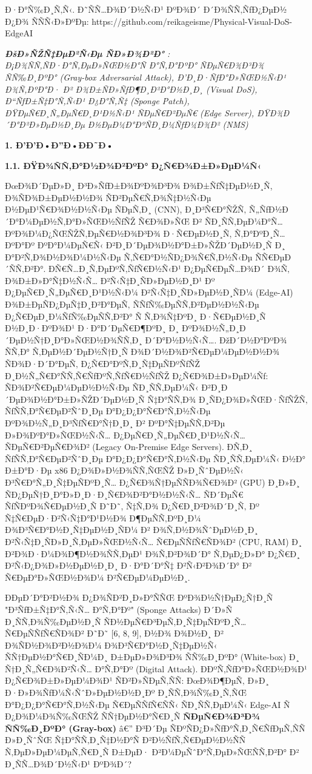 \documentclass[]{article}
\begin{document}
Ð·Ð°Ñ‰Ð¸Ñ‚Ñ‹. Ð˜ÑÑ…Ð¾Ð´Ð½Ñ‹Ð¹ ÐºÐ¾Ð´ Ð´Ð¾ÑÑ‚ÑƒÐ¿ÐµÐ½ Ð¿Ð¾ ÑÑÑ‹Ð»ÐºÐµ:
https://github.com/reikageisme/Physical-Visual-DoS-EdgeAI

\emph{\textbf{ÐšÐ»ÑŽÑ‡ÐµÐ²Ñ‹Ðµ ÑÐ»Ð¾Ð²Ð°} :} \emph{Ð¡Ð¾ÑÑ‚ÑÐ·Ð°Ñ‚ÐµÐ»ÑŒÐ½Ð°Ñ Ð°Ñ‚Ð°ÐºÐ° ÑÐµÑ€Ð¾Ð³Ð¾ ÑÑ‰Ð¸ÐºÐ° (Gray-box Adversarial Attack), Ð’Ð¸Ð·ÑƒÐ°Ð»ÑŒÐ½Ñ‹Ð¹ Ð¾Ñ‚ÐºÐ°Ð· Ð² Ð¾Ð±ÑÐ»ÑƒÐ¶Ð¸Ð²Ð°Ð½Ð¸Ð¸ (Visual DoS), Ð“ÑƒÐ±Ñ‡Ð°Ñ‚Ñ‹Ð¹ Ð¿Ð°Ñ‚Ñ‡ (Sponge Patch), ÐŸÐµÑ€Ð¸Ñ„ÐµÑ€Ð¸Ð¹Ð½Ñ‹Ð¹ ÑÐµÑ€Ð²ÐµÑ€ (Edge Server), ÐŸÐ¾Ð´Ð°Ð²Ð»ÐµÐ½Ð¸Ðµ Ð½ÐµÐ¼Ð°ÐºÑÐ¸Ð¼ÑƒÐ¼Ð¾Ð² (NMS)}

\textbf{1. Ð’Ð’Ð•Ð”Ð•ÐÐ˜Ð•}

\textbf{1.1. ÐŸÐ¾ÑÑ‚Ð°Ð½Ð¾Ð²ÐºÐ° Ð¿Ñ€Ð¾Ð±Ð»ÐµÐ¼Ñ‹}

ÐœÐ¾Ð´ÐµÐ»Ð¸ Ð³Ð»ÑƒÐ±Ð¾ÐºÐ¾Ð³Ð¾ Ð¾Ð±ÑƒÑ‡ÐµÐ½Ð¸Ñ, Ð¾ÑÐ¾Ð±ÐµÐ½Ð½Ð¾ ÑÐ²ÐµÑ€Ñ‚Ð¾Ñ‡Ð½Ñ‹Ðµ Ð½ÐµÐ¹Ñ€Ð¾Ð½Ð½Ñ‹Ðµ ÑÐµÑ‚Ð¸ (CNN), Ð¸Ð³Ñ€Ð°ÑŽÑ‚ Ñ„ÑƒÐ½Ð´Ð°Ð¼ÐµÐ½Ñ‚Ð°Ð»ÑŒÐ½ÑƒÑŽ Ñ€Ð¾Ð»ÑŒ Ð² ÑÐ¸ÑÑ‚ÐµÐ¼Ð°Ñ… ÐºÐ¾Ð¼Ð¿ÑŒÑŽÑ‚ÐµÑ€Ð½Ð¾Ð³Ð¾ Ð·Ñ€ÐµÐ½Ð¸Ñ, Ñ‚Ð°ÐºÐ¸Ñ… ÐºÐ°Ðº ÐºÐ°Ð¼ÐµÑ€Ñ‹ Ð²Ð¸Ð´ÐµÐ¾Ð½Ð°Ð±Ð»ÑŽÐ´ÐµÐ½Ð¸Ñ Ð¸ Ð°Ð²Ñ‚Ð¾Ð½Ð¾Ð¼Ð½Ñ‹Ðµ Ñ‚Ñ€Ð°Ð½ÑÐ¿Ð¾Ñ€Ñ‚Ð½Ñ‹Ðµ ÑÑ€ÐµÐ´ÑÑ‚Ð²Ð°. ÐÑ€Ñ…Ð¸Ñ‚ÐµÐºÑ‚ÑƒÑ€Ð½Ñ‹Ð¹ Ð¿ÐµÑ€ÐµÑ…Ð¾Ð´ Ð¾Ñ‚ Ð¾Ð±Ð»Ð°Ñ‡Ð½Ñ‹Ñ… Ð²Ñ‹Ñ‡Ð¸ÑÐ»ÐµÐ½Ð¸Ð¹ Ðº Ð¿ÐµÑ€Ð¸Ñ„ÐµÑ€Ð¸Ð¹Ð½Ñ‹Ð¼ Ð²Ñ‹Ñ‡Ð¸ÑÐ»ÐµÐ½Ð¸ÑÐ¼ (Edge-AI) Ð¾Ð±ÐµÑÐ¿ÐµÑ‡Ð¸Ð²Ð°ÐµÑ‚ ÑÑƒÑ‰ÐµÑÑ‚Ð²ÐµÐ½Ð½Ñ‹Ðµ Ð¿Ñ€ÐµÐ¸Ð¼ÑƒÑ‰ÐµÑÑ‚Ð²Ð° Ñ Ñ‚Ð¾Ñ‡ÐºÐ¸ Ð·Ñ€ÐµÐ½Ð¸Ñ Ð½Ð¸Ð·ÐºÐ¾Ð¹ Ð·Ð°Ð´ÐµÑ€Ð¶ÐºÐ¸ Ð¸ ÐºÐ¾Ð½Ñ„Ð¸Ð´ÐµÐ½Ñ†Ð¸Ð°Ð»ÑŒÐ½Ð¾ÑÑ‚Ð¸ Ð´Ð°Ð½Ð½Ñ‹Ñ…. ÐžÐ´Ð½Ð°ÐºÐ¾ ÑÑ‚Ð° Ñ‚ÐµÐ½Ð´ÐµÐ½Ñ†Ð¸Ñ Ð¾Ð´Ð½Ð¾Ð²Ñ€ÐµÐ¼ÐµÐ½Ð½Ð¾ ÑÐ¾Ð·Ð´Ð°ÐµÑ‚ Ð¿Ñ€Ð°ÐºÑ‚Ð¸Ñ‡ÐµÑÐºÑƒÑŽ Ð¸Ð½Ñ„Ñ€Ð°ÑÑ‚Ñ€ÑƒÐºÑ‚ÑƒÑ€Ð½ÑƒÑŽ Ð¿Ñ€Ð¾Ð±Ð»ÐµÐ¼Ñƒ: ÑÐ¾Ð²Ñ€ÐµÐ¼ÐµÐ½Ð½Ñ‹Ðµ ÑÐ¸ÑÑ‚ÐµÐ¼Ñ‹ Ð²Ð¸Ð´ÐµÐ¾Ð½Ð°Ð±Ð»ÑŽÐ´ÐµÐ½Ð¸Ñ Ñ‡Ð°ÑÑ‚Ð¾ Ð¸ÑÐ¿Ð¾Ð»ÑŒÐ·ÑƒÑŽÑ‚ ÑƒÑÑ‚Ð°Ñ€ÐµÐ²ÑˆÐ¸Ðµ Ð°Ð¿Ð¿Ð°Ñ€Ð°Ñ‚Ð½Ñ‹Ðµ ÐºÐ¾Ð½Ñ„Ð¸Ð³ÑƒÑ€Ð°Ñ†Ð¸Ð¸ Ð² ÐºÐ°Ñ‡ÐµÑÑ‚Ð²Ðµ Ð»Ð¾ÐºÐ°Ð»ÑŒÐ½Ñ‹Ñ… Ð¿ÐµÑ€Ð¸Ñ„ÐµÑ€Ð¸Ð¹Ð½Ñ‹Ñ… ÑÐµÑ€Ð²ÐµÑ€Ð¾Ð² (Legacy On-Premise Edge Servers). Ð­Ñ‚Ð¸ ÑƒÑÑ‚Ð°Ñ€ÐµÐ²ÑˆÐ¸Ðµ Ð°Ð¿Ð¿Ð°Ñ€Ð°Ñ‚Ð½Ñ‹Ðµ ÑÐ¸ÑÑ‚ÐµÐ¼Ñ‹ Ð½Ð° Ð±Ð°Ð·Ðµ x86 Ð¿Ð¾Ð»Ð½Ð¾ÑÑ‚ÑŒÑŽ Ð»Ð¸ÑˆÐµÐ½Ñ‹ Ð³Ñ€Ð°Ñ„Ð¸Ñ‡ÐµÑÐºÐ¸Ñ… Ð¿Ñ€Ð¾Ñ†ÐµÑÑÐ¾Ñ€Ð¾Ð² (GPU) Ð¸Ð»Ð¸ ÑÐ¿ÐµÑ†Ð¸Ð°Ð»Ð¸Ð·Ð¸Ñ€Ð¾Ð²Ð°Ð½Ð½Ñ‹Ñ… ÑÐ´ÐµÑ€ ÑƒÑÐºÐ¾Ñ€ÐµÐ½Ð¸Ñ Ð˜Ð˜, Ñ‡Ñ‚Ð¾ Ð¿Ñ€Ð¸Ð²Ð¾Ð´Ð¸Ñ‚ Ðº Ñ‡Ñ€ÐµÐ·Ð²Ñ‹Ñ‡Ð°Ð¹Ð½Ð¾ Ð¶ÐµÑÑ‚ÐºÐ¸Ð¼ Ð¾Ð³Ñ€Ð°Ð½Ð¸Ñ‡ÐµÐ½Ð¸ÑÐ¼ Ð² Ð¾Ñ‚Ð½Ð¾ÑˆÐµÐ½Ð¸Ð¸ Ð²Ñ‹Ñ‡Ð¸ÑÐ»Ð¸Ñ‚ÐµÐ»ÑŒÐ½Ñ‹Ñ… Ñ€ÐµÑÑƒÑ€ÑÐ¾Ð² (CPU, RAM) Ð¸ Ð²Ð¾Ð·Ð¼Ð¾Ð¶Ð½Ð¾ÑÑ‚ÐµÐ¹ Ð¾Ñ‚Ð²Ð¾Ð´Ð° Ñ‚ÐµÐ¿Ð»Ð° Ð¿Ñ€Ð¸ Ð²Ñ‹Ð¿Ð¾Ð»Ð½ÐµÐ½Ð¸Ð¸ Ð·Ð°Ð´Ð°Ñ‡ Ð²Ñ‹Ð²Ð¾Ð´Ð° Ð² Ñ€ÐµÐ°Ð»ÑŒÐ½Ð¾Ð¼ Ð²Ñ€ÐµÐ¼ÐµÐ½Ð¸.

ÐÐµÐ´Ð°Ð²Ð½Ð¾ Ð¿Ð¾ÑÐ²Ð¸Ð»Ð°ÑÑŒ ÐºÐ¾Ð½Ñ†ÐµÐ¿Ñ†Ð¸Ñ "Ð³ÑƒÐ±Ñ‡Ð°Ñ‚Ñ‹Ñ… Ð°Ñ‚Ð°Ðº" (Sponge Attacks) Ð´Ð»Ñ Ð¸ÑÑ‚Ð¾Ñ‰ÐµÐ½Ð¸Ñ ÑÐ½ÐµÑ€Ð³ÐµÑ‚Ð¸Ñ‡ÐµÑÐºÐ¸Ñ… Ñ€ÐµÑÑƒÑ€ÑÐ¾Ð² Ð˜Ð˜ {[}6, 8, 9{]}, Ð½Ð¾ Ð¾Ð½Ð¸ Ð² Ð¾ÑÐ½Ð¾Ð²Ð½Ð¾Ð¼ Ð¾Ð³Ñ€Ð°Ð½Ð¸Ñ‡ÐµÐ½Ñ‹ ÑÑ†ÐµÐ½Ð°Ñ€Ð¸ÑÐ¼Ð¸ Ð±ÐµÐ»Ð¾Ð³Ð¾ ÑÑ‰Ð¸ÐºÐ° (White-box) Ð¸ Ñ†Ð¸Ñ„Ñ€Ð¾Ð²Ñ‹Ñ… Ð°Ñ‚Ð°Ðº (Digital Attack). ÐÐºÑ‚ÑƒÐ°Ð»ÑŒÐ½Ð¾Ð¹ Ð¿Ñ€Ð¾Ð±Ð»ÐµÐ¼Ð¾Ð¹ ÑÐ²Ð»ÑÐµÑ‚ÑÑ: ÐœÐ¾Ð¶ÐµÑ‚ Ð»Ð¸ Ð·Ð»Ð¾ÑƒÐ¼Ñ‹ÑˆÐ»ÐµÐ½Ð½Ð¸Ðº Ð¸ÑÑ‚Ð¾Ñ‰Ð¸Ñ‚ÑŒ Ð°Ð¿Ð¿Ð°Ñ€Ð°Ñ‚Ð½Ñ‹Ðµ Ñ€ÐµÑÑƒÑ€ÑÑ‹ ÑÐ¸ÑÑ‚ÐµÐ¼Ñ‹ Edge-AI Ñ Ð¿Ð¾Ð¼Ð¾Ñ‰ÑŒÑŽ ÑÑ†ÐµÐ½Ð°Ñ€Ð¸Ñ \textbf{ÑÐµÑ€Ð¾Ð³Ð¾ ÑÑ‰Ð¸ÐºÐ° (Gray-box)} â€” Ð³Ð´Ðµ ÑÐºÑÐ¿Ð»ÑƒÐ°Ñ‚Ð¸Ñ€ÑƒÐµÑ‚ÑÑ Ð»Ð¸ÑˆÑŒ Ñ‡Ð°ÑÑ‚Ð¸Ñ‡Ð½Ð°Ñ Ð²Ð½ÑƒÑ‚Ñ€ÐµÐ½Ð½ÑÑ Ñ‚ÐµÐ»ÐµÐ¼ÐµÑ‚Ñ€Ð¸Ñ Ð±ÐµÐ· Ð²Ð¼ÐµÑˆÐ°Ñ‚ÐµÐ»ÑŒÑÑ‚Ð²Ð° Ð² Ð¸ÑÑ…Ð¾Ð´Ð½Ñ‹Ð¹ ÐºÐ¾Ð´?
\end{document}
